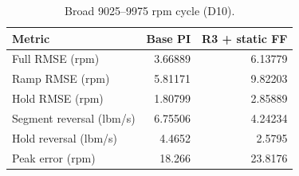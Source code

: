\begin{table}[htbp]\centering\small\setlength{\tabcolsep}{4pt}\begin{tabular}{@{}lrr@{}}\toprule
Metric & Base PI & R3 + static FF\\\midrule
Full RMSE (rpm) & 3.66889 & 6.13779\\
Ramp RMSE (rpm) & 5.81171 & 9.82203\\
Hold RMSE (rpm) & 1.80799 & 2.85889\\
Segment reversal (lbm/s) & 6.75506 & 4.24234\\
Hold reversal (lbm/s) & 4.4652 & 2.5795\\
Peak error (rpm) & 18.266 & 23.8176\\
\bottomrule\end{tabular}\caption{Broad 9025--9975 rpm cycle (D10).}\label{tab:broad}\end{table}